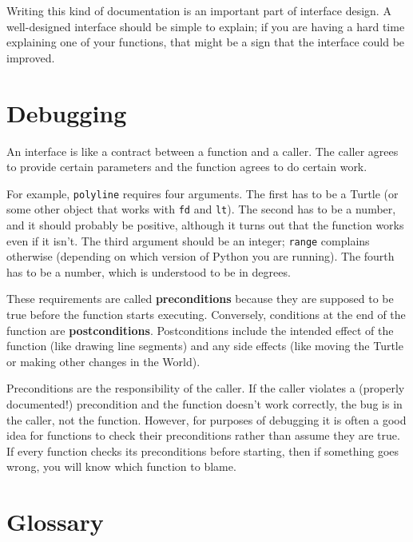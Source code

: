 \documentclass[10pt]{book}
\begin{document}
Writing this kind of documentation is an important part of interface
design.  A well-designed interface should be simple to explain;
if you are having a hard time explaining one of your functions,
that might be a sign that the interface could be improved.


\section{Debugging}

An interface is like a contract between a function and a caller.
The caller agrees to provide certain parameters and the function
agrees to do certain work.

For example, {\tt polyline} requires four arguments.  The first
has to be a Turtle (or some other object that works with {\tt fd}
and {\tt lt}).  The second has to be a number, and it should
probably be positive, although it turns out that the function
works even if it isn't.  The third argument should be an integer;
{\tt range} complains otherwise (depending on which version
of Python you are running).  The fourth has to be a number,
which is understood to be in degrees.

These requirements are called {\bf preconditions} because they
are supposed to be true before the function starts executing.
Conversely, conditions at the end of the function are
{\bf postconditions}.  Postconditions include the intended
effect of the function (like drawing line segments) and any
side effects (like moving the Turtle or making other changes
in the World).


Preconditions are the responsibility of the caller.  If the caller
violates a (properly documented!) precondition and the function
doesn't work correctly, the bug is in the caller, not the function.
However, for purposes of debugging it is often a good idea for
functions to check their preconditions rather than assume they are
true.  If every function checks its preconditions before starting,
then if something goes wrong, you will know which function to blame.


\section{Glossary}
\end{document}
